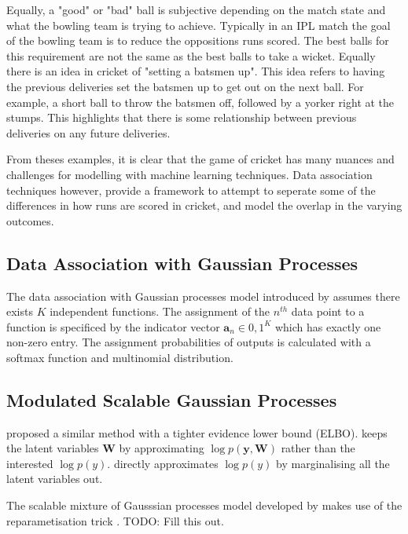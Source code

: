 \documentclass[12pt,a4paper]{report}
\theoremstyle{definition}
\begin{document}
Equally, a "good" or "bad" ball is subjective depending on the match state and what the bowling team is trying to achieve. 
Typically in an IPL match the goal of the bowling team is to reduce the oppositions runs scored. 
The best balls for this requirement are not the same as the best balls to take a wicket. 
Equally there is an idea in cricket of "setting a batsmen up". 
This idea refers to having the previous deliveries set the batsmen up to get out on the next ball. 
For example, a short ball to throw the batsmen off, followed by a yorker right at the stumps. 
This highlights that there is some relationship between previous deliveries on any future deliveries.

From theses examples, it is clear that the game of cricket has many nuances and challenges for modelling with machine learning techniques. 
Data association techniques however, provide a framework to attempt to seperate some of the differences in how runs are scored in cricket, and model the overlap in the varying outcomes.

\subsection{Data Association with Gaussian Processes}

The data association with Gaussian processes model introduced by \citet{Kaiser2018} assumes there exists $K$ independent functions.
The assignment of the $n^{th}$ data point to a function is specificed by the indicator vector $\textbf{a}_{n} \in {0, 1}^K$ which has exactly one non-zero entry.
The assignment probabilities of outputs is calculated with a softmax function and multinomial distribution. 

\subsection{Modulated Scalable Gaussian Processes}

\citet{Lui2020} proposed a similar method with a tighter evidence lower bound (ELBO).
\citet{Kaiser2018} keeps the latent variables $\textbf{W}$ by approximating $\log p(\textbf{y}, \textbf{W})$ rather than the interested $\log p(y)$.
\citet{Lui2020} directly approximates $\log p(y)$ by marginalising all the latent variables out.

The scalable mixture of Gausssian processes model developed by \citet{Lui2020} makes use of the reparametisation trick \citep{Maddison2017}.
TODO: Fill this out.
\end{document}
